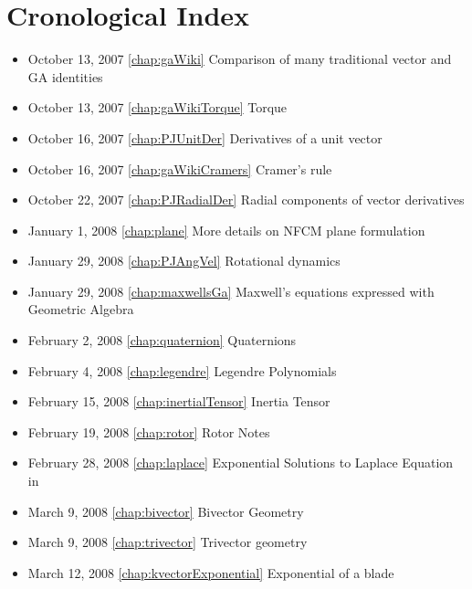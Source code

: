 \chapter{Cronological Index}
\begin{itemize}

\item October 13, 2007 \ref{chap:gaWiki} Comparison of many traditional vector and GA identities

\item October 13, 2007 \ref{chap:gaWikiTorque} Torque

\item October 16, 2007 \ref{chap:PJUnitDer} Derivatives of a unit vector

\item October 16, 2007 \ref{chap:gaWikiCramers} Cramer's rule

\item October 22, 2007 \ref{chap:PJRadialDer} Radial components of vector derivatives

\item January 1, 2008 \ref{chap:plane} More details on NFCM plane formulation

\item January 29, 2008 \ref{chap:PJAngVel} Rotational dynamics

\item January 29, 2008 \ref{chap:maxwellsGa} Maxwell's equations expressed with Geometric Algebra

\item February 2, 2008 \ref{chap:quaternion} Quaternions

\item February 4, 2008 \ref{chap:legendre} Legendre Polynomials

\item February 15, 2008 \ref{chap:inertialTensor} Inertia Tensor

\item February 19, 2008 \ref{chap:rotor} Rotor Notes

\item February 28, 2008 \ref{chap:laplace} Exponential Solutions to Laplace Equation in 

\item March 9, 2008 \ref{chap:bivector} Bivector Geometry

\item March 9, 2008 \ref{chap:trivector} Trivector geometry

\item March 12, 2008 \ref{chap:kvectorExponential} Exponential of a blade


\end{itemize}
